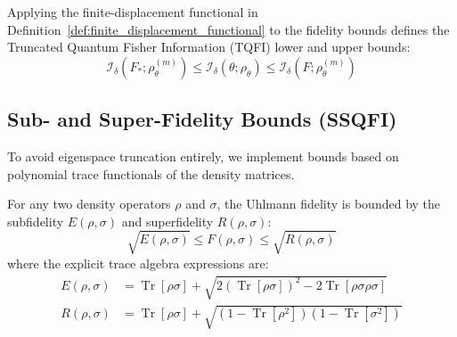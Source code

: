 \begin{definition}
    Applying the finite-displacement functional in Definition~\ref{def:finite_displacement_functional} to the fidelity bounds defines the Truncated Quantum Fisher Information (TQFI) lower and upper bounds:
    \begin{equation}
        \mathcal{I}_\delta\left(F_*; \rho_\theta^{(m)}\right) \le \mathcal{I}_\delta(\theta; \rho_\theta) \le \mathcal{I}_\delta\left(F; \rho_\theta^{(m)}\right)
        \label{eq:tqfi_bounds}
    \end{equation}
\end{definition}

\subsection{Sub- and Super-Fidelity Bounds (SSQFI)}
To avoid eigenspace truncation entirely, we implement bounds based on polynomial trace functionals of the density matrices.

\begin{definition}
    For any two density operators $\rho$ and $\sigma$, the Uhlmann fidelity is bounded by the subfidelity $E(\rho,\sigma)$ and superfidelity $R(\rho,\sigma)$:
    \begin{equation}
        \sqrt{E(\rho,\sigma)} \le F(\rho,\sigma) \le \sqrt{R(\rho,\sigma)}
    \end{equation}
    where the explicit trace algebra expressions are:
    \begin{align}
        E(\rho,\sigma) & = \operatorname{Tr}[\rho\sigma] + \sqrt{2 \left( \operatorname{Tr}[\rho\sigma] \right)^2 - 2 \operatorname{Tr}[\rho\sigma\rho\sigma]} \\
        R(\rho,\sigma) & = \operatorname{Tr}[\rho\sigma] + \sqrt{\left( 1 - \operatorname{Tr}[\rho^2] \right)\left( 1 - \operatorname{Tr}[\sigma^2] \right)}
    \end{align}
\end{definition}

